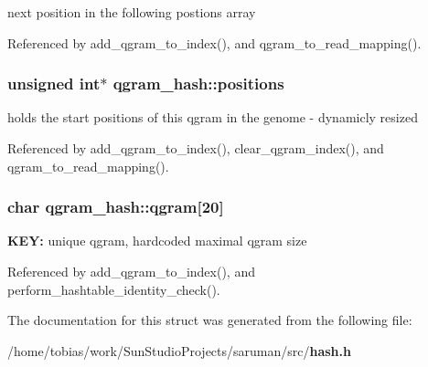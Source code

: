 next position in the following postions array 

Referenced by add\_\-qgram\_\-to\_\-index(), and qgram\_\-to\_\-read\_\-mapping().
\subsubsection[{positions}]{\setlength{\rightskip}{0pt plus 5cm}unsigned int$\ast$ {\bf qgram\_\-hash::positions}}\label{structqgram__hash_761579dabe3671fd68c446e6b75955ea}


holds the start positions of this qgram in the genome - dynamicly resized 

Referenced by add\_\-qgram\_\-to\_\-index(), clear\_\-qgram\_\-index(), and qgram\_\-to\_\-read\_\-mapping().
\subsubsection[{qgram}]{\setlength{\rightskip}{0pt plus 5cm}char {\bf qgram\_\-hash::qgram}[20]}\label{structqgram__hash_7c72b4c67544b3ee27c711af9a2dd27c}


{\bf KEY:} unique qgram, hardcoded maximal qgram size 

Referenced by add\_\-qgram\_\-to\_\-index(), and perform\_\-hashtable\_\-identity\_\-check().

The documentation for this struct was generated from the following file:\begin{CompactItemize}
\item 
/home/tobias/work/SunStudioProjects/saruman/src/{\bf hash.h}\end{CompactItemize}
